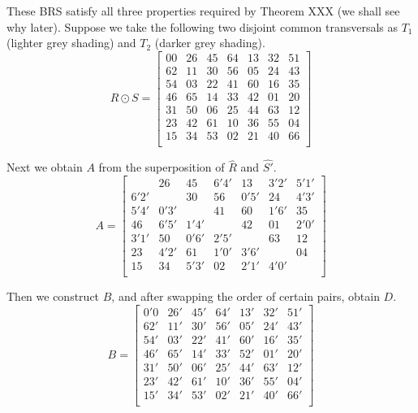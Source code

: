 \begin{example}
These BRS satisfy all three properties required by Theorem XXX (we shall see why later). 
Suppose we take the following two disjoint common transversals as $T_1$ (lighter grey shading) and $T_2$ (darker grey shading).
\begin{equation}
  R \odot S = \begin{bmatrix}
      00 & 26 & 45 & 64 & 13 & 32 & 51 \\
      62 & 11 & 30 & 56 & 05 & 24 & 43 \\
      54 & 03 & 22 & 41 & 60 & 16 & 35 \\
      46 & 65 & 14 & 33 & 42 & 01 & 20 \\
      31 & 50 & 06 & 25 & 44 & 63 & 12 \\
      23 & 42 & 61 & 10 & 36 & 55 & 04 \\
      15 & 34 & 53 & 02 & 21 & 40 & 66 \\
  \end{bmatrix}
\end{equation}

Next we obtain $A$ from the superposition of $\hat{R}$ and
$\hat{S'}$.
\begin{equation}
  A = \begin{bmatrix}
           & 26   & 45   & 6'4' & 13   & 3'2' & 5'1' \\
      6'2' &      & 30   & 56   & 0'5' & 24   & 4'3' \\
      5'4' & 0'3' &      & 41   & 60   & 1'6' & 35   \\
      46   & 6'5' & 1'4' &      & 42   & 01   & 2'0' \\
      3'1' & 50   & 0'6' & 2'5' &      & 63   & 12   \\
      23   & 4'2' & 61   & 1'0' & 3'6' &      & 04   \\
      15   & 34   & 5'3' & 02   & 2'1' & 4'0' &      \\
  \end{bmatrix}
\end{equation}

Then we construct $B$, and after swapping the order of certain pairs, obtain $D$.
\begin{equation}
  B = \begin{bmatrix}
      0'0 & 26' & 45' & 64' & 13' & 32' & 51'  \\
      62' & 11' & 30' & 56' & 05' & 24' & 43'  \\
      54' & 03' & 22' & 41' & 60' & 16' & 35'  \\
      46' & 65' & 14' & 33' & 52' & 01' & 20'  \\
      31' & 50' & 06' & 25' & 44' & 63' & 12'  \\
      23' & 42' & 61' & 10' & 36' & 55' & 04'  \\
      15' & 34' & 53' & 02' & 21' & 40' & 66'  \\
  \end{bmatrix}
\end{equation}


\end{example}

